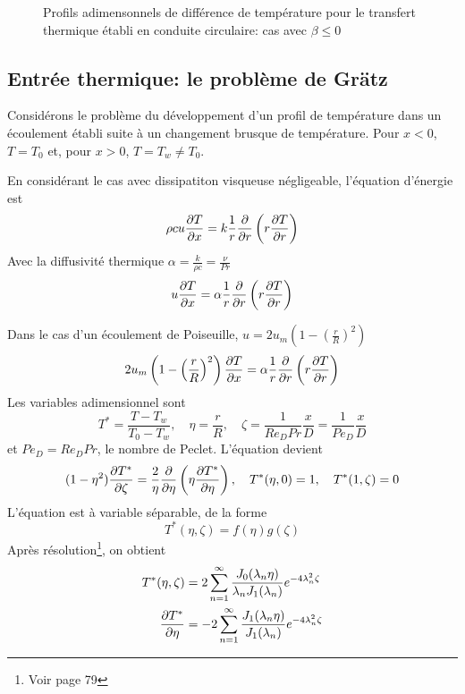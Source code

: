 \documentclass[a4paper,11pt]{report}
\newcommand{\recip}[1]{\frac{1}{#1}}
\begin{document}
      \begin{figure}[!h]
        \centering
        
        \caption{Profils adimensonnels de différence de température pour le transfert thermique établi en conduite circulaire: cas avec $\beta \leq 0$}
        \label{fig:profilDiffTempPos}
      \end{figure}

    \subsection{Entrée thermique: le problème de Grätz}
      Considérons le problème du développement d'un profil de température dans un écoulement établi suite à un changement brusque de température. Pour $x<0$, $T=T_0$ et, pour $x>0$, $T=T_w\neq T_0$.


      En considérant le cas avec dissipatiton visqueuse négligeable, l'équation d'énergie est
      \begin{equation}
        \rho c u \pdv{T}{x} = k \recip{r} \pdv{r}\left(r\pdv{T}{r}\right)
      \end{equation}
      Avec la diffusivité thermique $\alpha = \frac{k}{\rho c} = \frac{\nu}{Pr}$
      \begin{equation}
        u \pdv{T}{x} = \alpha \recip{r} \pdv{r}\left(r\pdv{T}{r}\right)
      \end{equation}

      Dans le cas d'un écoulement de Poiseuille, $u = 2u_m \left(1 - \left(\frac{r}{R}\right)^2\right)$
      \begin{equation}
        2u_m \left(1 - \left(\frac{r}{R}\right)^2\right) \pdv{T}{x} = \alpha \recip{r} \pdv{r} \left(r\pdv{T}{r}\right)
      \end{equation}
      Les variables adimensionnel sont
      \begin{equation}
        T^\ast = \frac{T-T_w}{T_0 - T_w}, \quad \eta = \frac{r}{R}, \quad \zeta = \recip{Re_D Pr} \frac{x}{D} = \recip{Pe_D} \frac{x}{D}
      \end{equation}
      et $Pe_D = Re_D Pr$, le nombre de Peclet. L'équation devient
      \begin{equation}
        (1-\eta^2) \pdv{T^\ast}{\zeta} = \frac{2}{\eta} \pdv{\eta} \left(\eta \pdv{T^\ast}{\eta}\right), \quad T^\ast (\eta, 0) = 1, \quad T^\ast (1, \zeta) = 0
      \end{equation}
      L'équation est à variable séparable, de la forme
      \begin{equation}
        T^\ast (\eta, \zeta) = f(\eta)g(\zeta)
      \end{equation}
      Après résolution\footnote{Voir page 79}, on obtient
      \begin{equation}
        \begin{aligned}
          T^\ast (\eta, \zeta) &= 2 \sum_{n=1}^\infty \frac{J_0 (\lambda_n \eta)}{\lambda_n J_1(\lambda_n)} e^{-4\lambda_n^2 \zeta}\\
          \pdv{T^\ast}{\eta} &= -2 \sum_{n=1}^\infty \frac{J_1(\lambda_n \eta)}{J_1(\lambda_n)} e^{-4\lambda_n^2 \zeta}
        \end{aligned}
      \end{equation}
\end{document}
